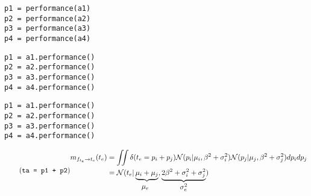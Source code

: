 \documentclass[article]{jss}
\newif\ifen
\newif\ifes
\newcommand{\en}[1]{\ifen#1\fi}
\newcommand{\es}[1]{\ifes#1\fi}
\newcommand{\N}{\mathcal{N}}
\begin{document}
\es{Tenemos acceso a estos mensajes mediante el método \texttt{performance()} de la clase \texttt{Player}.}
%
\begin{lstlisting}[backgroundcolor=\color{white},label=lst:performance, caption={\en{Computing the individual prior performance}\es{Computando el desempeño individual a priori}}, belowskip=-1.0 \baselineskip, aboveskip=0.0 \baselineskip]
\end{lstlisting}
\begin{paracol}{3}
\begin{lstlisting}[backgroundcolor=\color{julia}]
p1 = performance(a1)
p2 = performance(a2)
p3 = performance(a3)
p4 = performance(a4)
\end{lstlisting}
  \switchcolumn
\begin{lstlisting}[backgroundcolor=\color{python}]
p1 = a1.performance()
p2 = a2.performance()
p3 = a3.performance()
p4 = a4.performance()
\end{lstlisting}
   \switchcolumn
\begin{lstlisting}[backgroundcolor=\color{r}]
p1 = a1.performance()
p2 = a2.performance()
p3 = a3.performance()
p4 = a4.performance()
\end{lstlisting}  
\end{paracol}
%
\en{Where the agents \texttt{a1}, \texttt{a2}, \texttt{a3}, and \texttt{a4} were initialized at code~\ref{lst:player}.}
\es{Donde los agentes \texttt{a1}, \texttt{a2}, \texttt{a3} y \texttt{a4}, fueron inicializados en el código~\ref{lst:player}.}
%
\en{The message sent by the team factors $f_{t_e}$ to the team variable $t_e$ is an integral over all the individual performance variables, with the sum being equal to a constant $t_e$ (constraint imposed by the Dirac delta function).}
\es{El mensaje que envían los factores equipos $f_{t_e}$ a la variable equipo $t_e$ es una integral sobre todas las variables de rendimiento individuales, siendo la suma igual a una constante $t_e$ (restricción impuesta por la función delta de Dirac).}
%
\begin{equation*} \label{eq:m_ft_t} \tag{\texttt{ta = p1 + p2}}
\begin{split}
 m_{f_{t_e} \rightarrow t_e}(t_e) &= \iint \delta(t_e = p_i + p_j) \N(p_i|\mu_i,\beta^2 + \sigma_i^2)\N(p_j|\mu_j,\beta^2 + \sigma_j^2) dp_idp_j  \\ &=  \N(t_e|\underbrace{\mu_i+\mu_j}_{\text{\normalsize $\mu_e\phantom{^2}$}}, \underbrace{2\beta^2 + \sigma_i^2 + \sigma_j^2}_{\text{\normalsize $\sigma_e^2$}})
\end{split}
\end{equation*}
\end{document}
